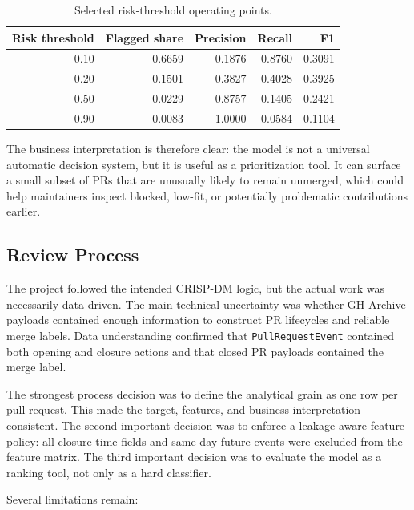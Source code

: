 \begin{table}[H]
    \centering
    \caption{Selected risk-threshold operating points.}
    \label{tab:risk_thresholds}
    \begin{tabular}{rrrrr}
        \toprule
        Risk threshold & Flagged share & Precision & Recall & F1 \\
        \midrule
        0.10 & 0.6659 & 0.1876 & 0.8760 & 0.3091 \\
        0.20 & 0.1501 & 0.3827 & 0.4028 & 0.3925 \\
        0.50 & 0.0229 & 0.8757 & 0.1405 & 0.2421 \\
        0.90 & 0.0083 & 1.0000 & 0.0584 & 0.1104 \\
        \bottomrule
    \end{tabular}
\end{table}

The business interpretation is therefore clear: the model is not a universal automatic decision system, but
it is useful as a prioritization tool. It can surface a small subset of PRs that are unusually likely to
remain unmerged, which could help maintainers inspect blocked, low-fit, or potentially problematic
contributions earlier.

\subsection{Review Process}

The project followed the intended CRISP-DM logic, but the actual work was necessarily data-driven. The main
technical uncertainty was whether GH Archive payloads contained enough information to construct PR lifecycles
and reliable merge labels. Data understanding confirmed that \texttt{PullRequestEvent} contained both opening
and closure actions and that closed PR payloads contained the merge label.

The strongest process decision was to define the analytical grain as one row per pull request. This made the
target, features, and business interpretation consistent. The second important decision was to enforce a
leakage-aware feature policy: all closure-time fields and same-day future events were excluded from the
feature matrix. The third important decision was to evaluate the model as a ranking tool, not only as a hard classifier.

Several limitations remain:

